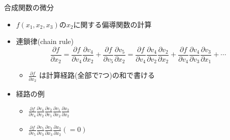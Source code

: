 \begin{frame}[t,fragile]{合成関数の微分}
  \begin{itemize}
  \item $f(x_1,x_2,x_3)$の$x_2$に関する偏導関数の計算
  \item 連鎖律(chain rule)
    \[
      \frac{\partial f}{\partial x_2} = \frac{\partial f}{\partial v_4} \frac{\partial v_4}{\partial x_2} + \frac{\partial f}{\partial v_5} \frac{\partial v_5}{\partial x_2} = \frac{\partial f}{\partial v_4} \frac{\partial v_4}{\partial v_2} \frac{\partial v_2}{\partial x_2} + \frac{\partial f}{\partial v_4} \frac{\partial v_4}{\partial v_3} \frac{\partial v_3}{\partial x_1} + \cdots
    \]
    \begin{itemize}
    \item $\displaystyle \frac{\partial f}{\partial x_2}$ は計算経路(全部で7つ)の和で書ける
    \end{itemize}
  \item 経路の例
    \begin{itemize}
    \item $\displaystyle \frac{\partial f}{\partial v_4} \frac{\partial v_4}{\partial v_2} \frac{\partial v_2}{\partial v_1} \frac{\partial v_1}{\partial x_2} \frac{\partial x_2}{\partial x_2} $
    \item $\displaystyle \frac{\partial f}{\partial v_5} \frac{\partial v_5}{\partial v_3} \frac{\partial v_3}{\partial x_3} \frac{\partial x_3}{\partial x_2} (=0)$
    \end{itemize}

\end{itemize}
\end{frame}
